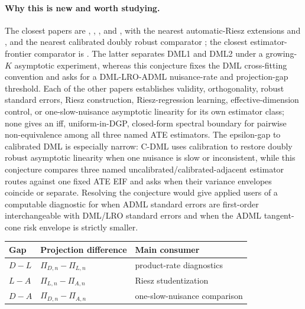 \documentclass[11pt]{article}
\theoremstyle{definition}
\theoremstyle{plain}
\theoremstyle{remark}
\begin{document}
\paragraph{Why this is new and worth studying.}
The closest papers are \citet{ChernozhukovEtAl2018DML},
\citet{ChernozhukovEscancianoIchimuraNeweyRobins2022LRO},
\citet{ChernozhukovNeweySingh2022ADML}, and
\citet{ChernozhukovNeweySingh2022RR}, with the nearest automatic-Riesz
extensions \citet{ChernozhukovNeweyQuintasMartinezSyrgkanis2024RieszRegression}
and \citet{Singh2024KRRR}, and the nearest calibrated doubly robust comparator
\citet{vanDerLaanLuedtkeCarone2024CDML}; the closest estimator-frontier
comparator is \citet{Velez2024DML}.  The latter separates DML1 and DML2 under a
growing-\(K\) asymptotic experiment, whereas this conjecture fixes the DML
cross-fitting convention and asks for a DML-LRO-ADML nuisance-rate and
projection-gap threshold.  Each of the other papers establishes validity,
orthogonality, robust standard errors, Riesz construction, Riesz-regression
learning, effective-dimension control, or one-slow-nuisance asymptotic
linearity for its own estimator class; none gives an iff, uniform-in-DGP,
closed-form spectral boundary for pairwise non-equivalence among all three
named ATE estimators.  The epsilon-gap to calibrated DML is especially narrow:
C-DML uses calibration to restore doubly robust asymptotic linearity when one
nuisance is slow or inconsistent, while this conjecture compares three named
uncalibrated/calibrated-adjacent estimator routes against one fixed ATE EIF and
asks when their variance envelopes coincide or separate.
Resolving the conjecture would give applied users of
\citet{ChernozhukovNeweySingh2022ADML} a computable diagnostic for when ADML
standard errors are first-order interchangeable with DML/LRO standard errors
and when the ADML tangent-cone risk envelope is strictly smaller.

\begin{center}
\begin{tabular}{lll}
\hline
Gap & Projection difference & Main consumer \\
\hline
\(D-L\) & \(\Pi_{D,n}-\Pi_{L,n}\) & \citet{ChernozhukovEtAl2018DML} product-rate diagnostics \\
\(L-A\) & \(\Pi_{L,n}-\Pi_{A,n}\) & \citet{ChernozhukovNeweySingh2022ADML} Riesz studentization \\
\(D-A\) & \(\Pi_{D,n}-\Pi_{A,n}\) & \citet{vanDerLaanLuedtkeCarone2024CDML} one-slow-nuisance comparison \\
\hline
\end{tabular}
\end{center}
\end{document}
